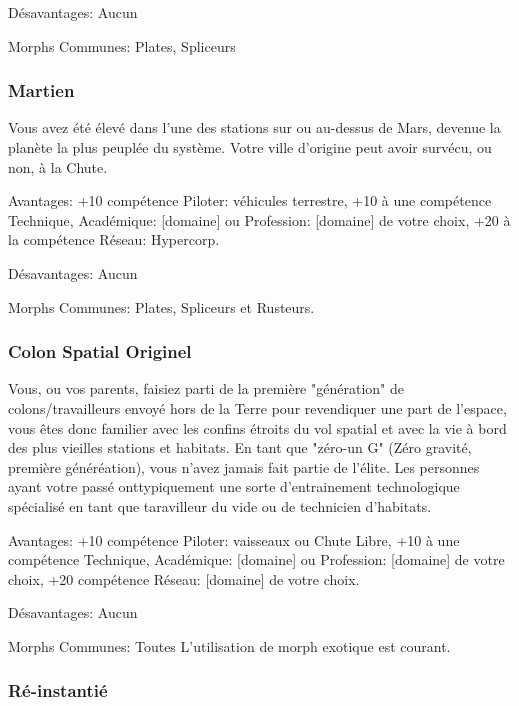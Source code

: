 Désavantages: Aucun 

Morphs Communes: Plates, Spliceurs 





\subsubsection{Martien} \label{sec:martian} 

Vous avez été élevé dans l'une des stations sur ou au-dessus de Mars, devenue la planète la plus peuplée du système. Votre ville d'origine peut avoir survécu, ou non, à la Chute. 

Avantages: +10 compétence Piloter: véhicules terrestre, +10 à une compétence Technique, Académique: [domaine] ou Profession: [domaine] de votre choix, +20 à la compétence Réseau: Hypercorp. 

Désavantages: Aucun 

Morphs Communes: Plates, Spliceurs et Rusteurs. 

\subsubsection{Colon Spatial Originel} \label{sec:original-space-colonist} 

Vous, ou vos parents, faisiez parti de la première "génération" de colons/travailleurs envoyé hors de la Terre pour revendiquer une part de l'espace, vous êtes donc familier avec les confins étroits du vol spatial et avec la vie à bord des plus vieilles stations et habitats. En tant que "zéro-un G" (Zéro gravité, première généréation), vous n'avez jamais fait partie de l'élite. Les personnes ayant votre passé onttypiquement une sorte d'entrainement technologique spécialisé en tant que taravilleur du vide ou de technicien d'habitats. 

Avantages: +10 compétence Piloter: vaisseaux ou Chute Libre, +10 à une compétence Technique, Académique: [domaine] ou Profession: [domaine] de votre choix, +20 compétence Réseau: [domaine] de votre choix. 

Désavantages: Aucun 

Morphs Communes: Toutes L'utilisation de morph exotique est courant. 

\subsubsection{Ré-instantié} \label{sec:re-instantiated} 

